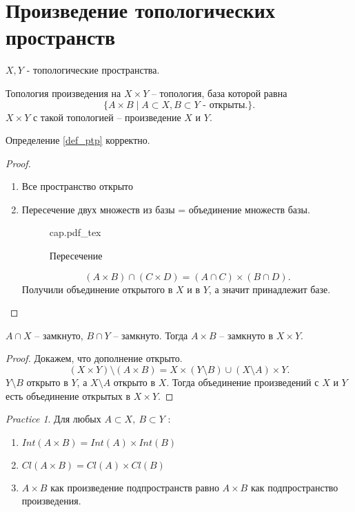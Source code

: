 \documentclass[11pt]{book}
\newcommand{\incfig}[1]{%
    \def\svgwidth{\columnwidth}
    {#1.pdf_tex}
}
\theoremstyle{definition}
\theoremstyle{plain}
\theoremstyle{plain}
\theoremstyle{definition}
\theoremstyle{remark}
\newtheorem*{prac}{Practice}
\begin{document}
\section{Произведение топологических пространств}
\begin{defn}\label{def_ptp}
    $X, Y$ - топологические пространства.

    Топология произведения на $X \times Y$ -- топология, база которой равна
    \[
	\{A \times B \mid A \subset X, B \subset Y \mbox{ - открыты.}\}
    .\]
    $X \times Y$ с такой топологией -- произведение $X$ и $Y$.
\end{defn}
\begin{thm}
    Определение \ref{def_ptp} корректно.
\end{thm}
\begin{proof}
    \begin{enumerate}
	\item Все пространство открыто
	\item Пересечение двух множеств из базы = объединение множеств базы.
	    \begin{figure}[ht]
		\centering
		\incfig{cap}
		\caption{Пересечение}
		\label{fig:cap}
	    \end{figure}
	    \[
		(A \times B) \cap (C \times D) = (A \cap C) \times (B \cap D)
	    .\]
	    Получили объединение открытого в $X$ и в $Y$, а значит принадлежит базе.
    \end{enumerate}
\end{proof}
\begin{thm}
    $A \cap X$ -- замкнуто, $B \cap Y$ -- замкнуто. Тогда $A \times B $ -- замкнуто в $X \times Y$.
\end{thm}
\begin{proof}
    Докажем, что дополнение открыто.
    \[
	(X \times Y) \setminus(A \times B) = X \times (Y \setminus B) \cup (X \setminus A) \times Y
    .\]
    $Y \setminus B$ открыто в $Y$, а $X \setminus A$ открыто в $X$. Тогда объединение произведений с $X$ и $Y$ есть объединение открытых в $X \times Y$.
\end{proof}
\begin{prac}
    Для любых $A \subset X, ~ B \subset Y$ :
    \begin{enumerate}
	\item $Int (A \times B) = Int(A) \times Int(B)$
	\item  $Cl (A \times B) = Cl(A) \times Cl(B)$
	\item  $A \times B$  как произведение подпространств равно $A \times B$ как подпространство произведения.
    \end{enumerate}
\end{prac}
\end{document}
